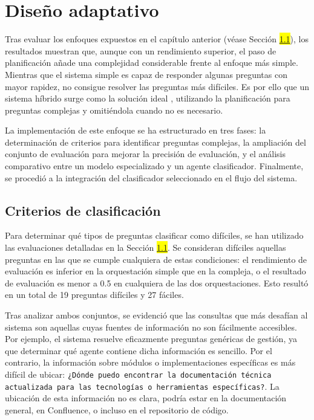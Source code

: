 \section{Diseño adaptativo}
Tras evaluar los enfoques expuestos en el capítulo anterior (véase Sección \colorbox{yellow}{\ref{}}), los resultados muestran que, aunque con un rendimiento superior, el paso de planificación añade una complejidad considerable frente al enfoque más simple. Mientras que el sistema simple es capaz de responder algunas preguntas con mayor rapidez, no consigue resolver las preguntas más difíciles. Es por ello que un sistema híbrido surge como la solución ideal \cite{jeong_adaptive-rag_2024}, utilizando la planificación para preguntas complejas y omitiéndola cuando no es necesario.

La implementación de este enfoque se ha estructurado en tres fases: la determinación de criterios para identificar preguntas complejas, la ampliación del conjunto de evaluación para mejorar la precisión de evaluación, y el análisis comparativo entre un modelo especializado y un agente clasificador. Finalmente, se procedió a la integración del clasificador seleccionado en el flujo del sistema.

\subsection{Criterios de clasificación}

Para determinar qué tipos de preguntas clasificar como difíciles, se han utilizado las evaluaciones detalladas en la Sección \colorbox{yellow}{\ref{}}. Se consideran difíciles aquellas preguntas en las que se cumple cualquiera de estas condiciones: el rendimiento de evaluación es inferior en la orquestación simple que en la compleja, o el resultado de evaluación es menor a 0.5 en cualquiera de las dos orquestaciones. Esto resultó en un total de 19 preguntas difíciles y 27 fáciles.

Tras analizar ambos conjuntos, se evidenció que las consultas que más desafían al sistema son aquellas cuyas fuentes de información no son fácilmente accesibles. Por ejemplo, el sistema resuelve eficazmente preguntas genéricas de gestión, ya que determinar qué agente contiene dicha información es sencillo. Por el contrario, la información sobre módulos o implementaciones específicas es más difícil de ubicar: \texttt{¿Dónde puedo encontrar la documentación técnica actualizada para las tecnologías o herramientas específicas?}. La ubicación de esta información no es clara, podría estar en la documentación general, en Confluence, o incluso en el repositorio de código.

